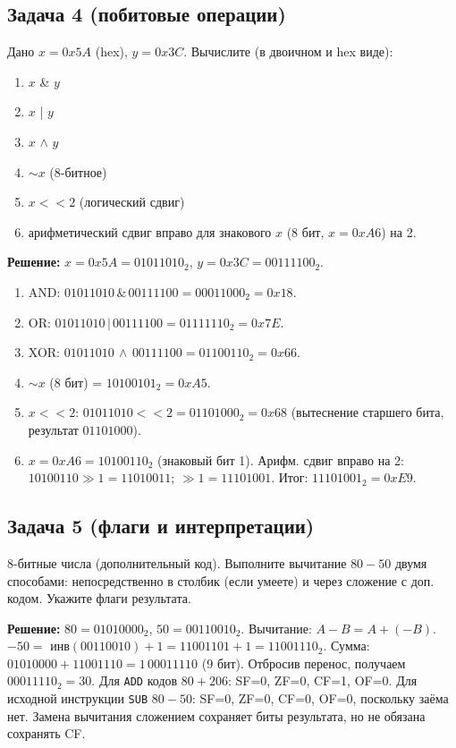 \subsection*{Задача 4 (побитовые операции)}
Дано $x = 0x5A$ (hex), $y = 0x3C$. Вычислите (в двоичном и hex виде):
\begin{enumerate}
    \item[a)] $x$ \& $y$
    \item[b)] $x$ | $y$
    \item[c)] $x$ $\wedge$ $y$
    \item[d)] $\sim x$ (8-битное)
    \item[e)] $x << 2$ (логический сдвиг)
    \item[f)] арифметический сдвиг вправо для знакового $x$ (8 бит, $x = 0xA6$) на 2.
\end{enumerate}

\textbf{Решение:}
$x = 0x5A = 01011010_2$, $y = 0x3C = 00111100_2$.
\begin{enumerate}
    \item[a)] AND: $01011010 \,\&\, 00111100 = 00011000_2 = 0x18$.
    \item[b)] OR: $01011010 \,|\, 00111100 = 01111110_2 = 0x7E$.
    \item[c)] XOR: $01011010 \,\wedge\, 00111100 = 01100110_2 = 0x66$.
    \item[d)] $\sim x$ (8 бит) = $10100101_2 = 0xA5$.
    \item[e)] $x << 2$: $01011010 << 2 = 01101000_2 = 0x68$ (вытеснение старшего бита, результат $01101000$).
    \item[f)] $x = 0xA6 = 10100110_2$ (знаковый бит 1). Арифм. сдвиг вправо на 2: $10100110 \gg 1 = 11010011$; $\gg 1 = 11101001$. Итог: $11101001_2 = 0xE9$.
\end{enumerate}

\subsection*{Задача 5 (флаги и интерпретации)}
8-битные числа (дополнительный код). Выполните вычитание $80 - 50$ двумя способами: непосредственно в столбик (если умеете) и через сложение с доп. кодом. Укажите флаги результата.

\textbf{Решение:}
$80 = 01010000_2$, $50 = 00110010_2$.
Вычитание: $A - B = A + (-B)$. $-50 =$ инв$(00110010)+1 = 11001101+1=11001110_2$.
Сумма: $01010000 + 11001110 = 1\,00011110$ (9 бит). Отбросив перенос, получаем $00011110_2 = 30$.
Для \texttt{ADD} кодов $80+206$: SF=0, ZF=0, CF=1, OF=0.
Для исходной инструкции \texttt{SUB} $80-50$: SF=0, ZF=0, CF=0, OF=0,
поскольку заёма нет. Замена вычитания сложением сохраняет биты результата,
но не обязана сохранять CF.

